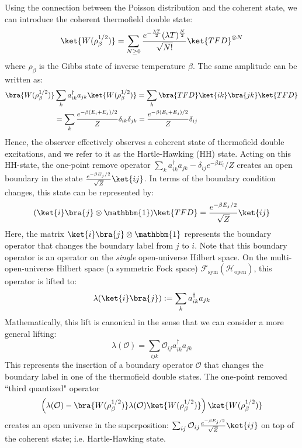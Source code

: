 \documentclass[a4paper,11pt]{article}
\theoremstyle{definition}
\numberwithin{equation}{section}
\newcommand{\mO}{\mathcal{O}}
\newcommand{\lb}{\left(}
\newcommand{\rb}{\right)}
\begin{document}
Using the connection between the Poisson distribution and the coherent state, we can introduce the coherent thermofield double state:
\begin{equation}
    \ket{W(\rho_\beta^{1/2})} = \sum_{N\geq 0}\frac{e^{-\frac{\lambda T}{2}}(\lambda T)^{\frac{N}{2}}}{\sqrt{N!}}\ket{TFD}^{\otimes N}
\end{equation}
where $\rho_\beta$ is the Gibbs state of inverse temperature $\beta$.
The same amplitude can be written as:
\begin{align}
    \begin{split}
        \bra{W(\rho_\beta^{1/2})}&\sum_ka^\dagger_{ik}a_{jk}\ket{W(\rho_\beta^{1/2})} =\sum_k\bra{TFD}\ket{ik}\bra{jk}\ket{TFD}
        \\&=\sum_k\frac{e^{-\beta(E_i + E_j)/2}}{Z}\delta_{ik}\delta_{jk}
        =\frac{e^{-\beta(E_i + E_j)/2}}{Z}\delta_{ij}
    \end{split}
\end{align}
Hence, the observer effectively observes a coherent state of thermofield double excitations, and we refer to it as the Hartle-Hawking (HH) state. Acting on this HH-state, the one-point remove operator $\sum_k a^\dagger_{ik}a_{jk}-\delta_{ij}e^{-\beta E_i}/Z$ creates an open boundary in the state $\frac{e^{-\beta E_j/2}}{\sqrt{Z}}\ket{ij}$. In terms of the boundary condition changes, this state can be represented by:
\begin{equation}
    (\ket{i}\bra{j}\otimes\mathbbm{1})\ket{TFD} = \frac{e^{-\beta E_j/2}}{\sqrt{Z}}\ket{ij}
\end{equation}
Here, the matrix $\ket{i}\bra{j}\otimes\mathbbm{1}$ represents the boundary operator that changes the boundary label from $j$ to $i$. Note that this boundary operator is an operator on the \textit{single} open-universe Hilbert space. On the multi-open-universe Hilbert space (a symmetric Fock space) $\mathcal{F}_\text{sym}(\mathcal{H}_\text{open})$, this operator is lifted to:
\begin{equation}
    \lambda(\ket{i}\bra{j}):=\sum_ka^\dagger_{ik}a_{jk}
\end{equation}
Mathematically, this lift is canonical in the sense that we can consider a more general lifting:
\begin{equation}
    \lambda(\mathcal{O}) = \sum_{ijk} \mathcal{O}_{ij}a^\dagger_{ik}a_{jk}
\end{equation}
This represents the insertion of a boundary operator $\mathcal{O}$ that changes the boundary label in one of the thermofield double states. The one-point removed ``third quantized" operator 
\begin{eqnarray}
    \lb \lambda(\mO)-\bra{W(\rho_\beta^{1/2})}\lambda(\mO)\ket{W(\rho_\beta^{1/2})}\rb \ket{W(\rho_\beta^{1/2})}
\end{eqnarray}
creates an open universe in the superposition: $\sum_{ij}\mathcal{O}_{ij} \frac{e^{-\beta E_j/2}}
{\sqrt{Z}}\ket{ij}$ on top of the coherent state; i.e. Hartle-Hawking state.
\end{document}
